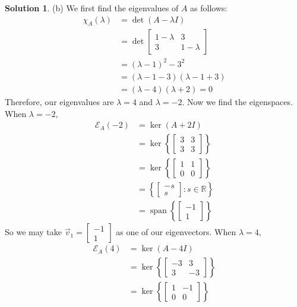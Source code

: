 \documentclass[11pt]{article}
\theoremstyle{definition}\newtheorem{definition}{Definition}
\theoremstyle{definition}\newtheorem{question}{Question}
\theoremstyle{definition}\newtheorem*{solution}{Solution}
\theoremstyle{definition}\newtheorem{example}{Example}
\theoremstyle{definition}\newtheorem{notation}{Notation}
\theoremstyle{theorem}\newtheorem{theorem}{Theorem}
\theoremstyle{theorem}\newtheorem{corollary}{Corollary}
\theoremstyle{theorem}\newtheorem{lemma}{Lemma}
\theoremstyle{theorem}\newtheorem{proposition}{Proposition}
\newcommand{\E}{\mathcal{E}}
\newcommand{\R}{\mathbb{R}}
\DeclareMathOperator{\Span}{span}
\begin{document}
\begin{solution}
    (b) We first find the eigenvalues of $A$ as follows:
    \begin{align*}
        \chi_A(\lambda) &= \det(A - \lambda I) \\
        &= \det\begin{bmatrix} 1 - \lambda & 3 \\ 3 & 1 - \lambda \end{bmatrix} \\
        &= (\lambda - 1)^2 - 3^2 \\
        &= (\lambda - 1 - 3)(\lambda - 1 + 3) \\
        &= (\lambda - 4)(\lambda + 2) = 0
    \end{align*}
    Therefore, our eigenvalues are $\lambda = 4$ and $\lambda = -2$. Now we find the eigenspaces. When $\lambda = -2$,
    \begin{align*}
        \E_A(-2) &= \ker(A + 2I) \\
        &= \ker\left\{\begin{bmatrix} 3 & 3 \\ 3 & 3 \end{bmatrix}\right\} \\
        &= \ker\left\{\begin{bmatrix} 1 & 1 \\ 0 & 0 \end{bmatrix}\right\} \\
        &= \left\{\begin{bmatrix} -s \\ s \end{bmatrix} : s \in \R\right\} \\
        &= \Span\left\{\begin{bmatrix} -1 \\ 1 \end{bmatrix}\right\}
    \end{align*}
    So we may take $\vec{v}_1 = \begin{bmatrix} -1 \\ 1 \end{bmatrix}$ as one of our eigenvectors. When $\lambda = 4$,
    \begin{align*}
        \E_A(4) &= \ker(A - 4I) \\
        &= \ker\left\{\begin{bmatrix} -3 & 3 \\ 3 & -3 \end{bmatrix}\right\} \\
        &= \ker\left\{\begin{bmatrix} 1 & -1 \\ 0 & 0 \end{bmatrix}\right\} \\

\end{align*}
\end{solution}
\end{document}
